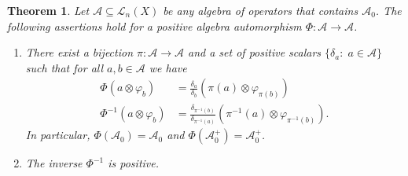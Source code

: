 \documentclass[12pt,reqno]{amsart}
\theoremstyle{plain}
\newtheorem{theorem}{Theorem}[section]
\theoremstyle{definition}
\begin{document}
\begin{theorem}\label{main theorem}
Let $\mathscr A\subseteq \mathscr L_n(X)$ be any algebra of operators that contains $\mathscr A_0$. The following assertions hold for a positive algebra automorphism $\Phi\colon \mathscr A\to \mathscr A$.
\begin{enumerate}
  \item There exist a bijection $\pi\colon\mathcal A\to\mathcal A$ and a set of positive scalars $\{\delta_a:\; a\in\mathcal A\}$ such that
for all $a,b\in\mathcal A$ we have
\begin{align}
\Phi(a\otimes\varphi_b)&=\tfrac{\delta_a}{\delta_b} \left(\pi(a)\otimes\varphi_{\pi(b)}\right) \label{formula1}\\
\Phi^{-1}(a\otimes\varphi_b)&=\tfrac{\delta_{\pi^{-1}(b)}}{\delta_{\pi^{-1}(a)}} \left(\pi^{-1}(a)\otimes\varphi_{\pi^{-1}(b)}\right). \label{formula2}
\end{align}
In particular,
$\Phi(\mathscr A_0)=\mathscr A_0$ and $\Phi(\mathscr A_0^+)=\mathscr A_0^+$. 
  \item The inverse $\Phi^{-1}$ is positive.
\end{enumerate}
\end{theorem}
\end{document}
